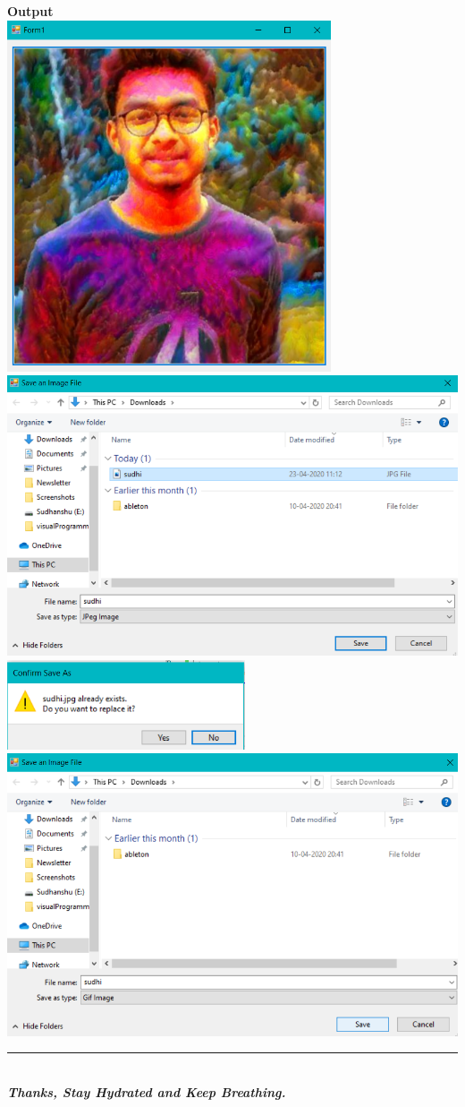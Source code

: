 \documentclass[11pt]{article}
\begin{document}
	\begin{center}
		\textbf{Output}\\
		\hfill\break\includegraphics[width=3.77in]{1.png}\\
		\hfill\break\includegraphics[width=5.27in]{2.png}\\
		\hfill\break\includegraphics[width=2.77in]{3.png}\\
		\hfill\break\includegraphics[width=5.27in]{4.png}\\
		\hfill\break\rule{6.27in}{1.2pt}\\
		\hfill\break\textbf{\emph{Thanks, Stay Hydrated and Keep Breathing.}}
	\end{center}
\end{document}

